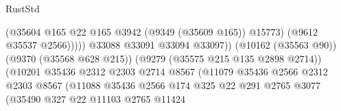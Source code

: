 \begin{lexlean}{RustStd}
\begin{coremodule}
                                                            (@35604
                                                              @165
                                                              @22
                                                              @165
                                                              @3942
                                                              (@9349 (@35609 @165))
                                                              @15773)
                                                            (@9612 @35537 @2566)))))
                                                    @33088
                                                    @33091
                                                    @33094
                                                    @33097))
                                                (@10162 (@35563 @90))
                                                (@9370 (@35568 @628 @215))
                                                (@9279 (@35575 @215 @135 @2898 @2714))
                                                (@10201
                                                  @35436
                                                  @2312
                                                  @2303
                                                  @2714
                                                  @8567
                                                  (@11079
                                                    @35436
                                                    @2566
                                                    @2312
                                                    @2303
                                                    @8567
                                                    (@11088
                                                      @35436
                                                      @2566
                                                      @174
                                                      @325
                                                      @22
                                                      @291
                                                      @2765
                                                      @3077
                                                      (@35490
                                                        @327
                                                        @22
                                                        @11103
                                                        @2765
                                                        @11424

\end{coremodule}
\end{lexlean}
